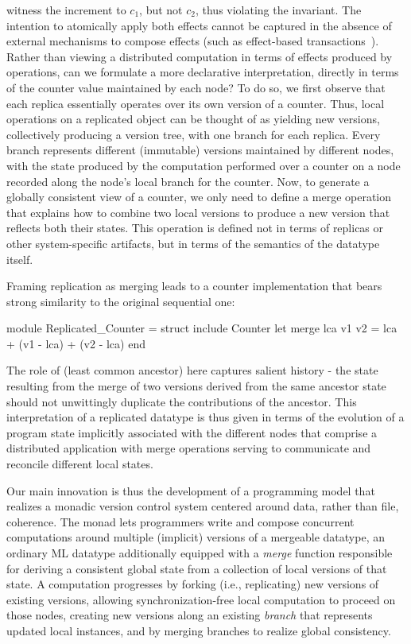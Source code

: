 witness the increment to $c_1$, but not $c_2$, thus violating the
invariant. The intention to atomically apply both effects cannot be
captured in the absence of external mechanisms to compose effects
(such as effect-based transactions~\cite{pldi15}).  Rather than
viewing a distributed computation in terms of  effects produced
by operations, can we formulate a more declarative interpretation,
directly in terms of the counter value maintained by each node?  To do
so, we first observe that each replica essentially operates over its
own version of a counter.  Thus, local operations on a replicated
object can be thought of as yielding new versions, collectively
producing a version tree, with one branch for each replica.  Every
branch represents different (immutable) versions maintained by
different nodes, with the state produced by the computation performed
over a counter on a node recorded along the node's local branch for
the counter.  Now, to generate a globally consistent view of a
counter, we only need to define a merge operation that explains how to
combine two local versions to produce a new version that reflects both
their states.  This operation is defined not in terms of replicas or
other system-specific artifacts, but in terms of the semantics of the
datatype itself.

Framing replication as merging leads to a counter implementation that
bears strong similarity to the original sequential one:
  \begin{ocaml}
    module Replicated_Counter = struct
      include Counter
      let merge lca v1 v2 =
         lca + (v1 - lca) + (v2 - lca)
    end
  \end{ocaml}
The role of  (least common ancestor) here captures salient
history - the state resulting from the merge of two versions derived
from the same ancestor state should not unwittingly duplicate the
contributions of the ancestor.  This interpretation of a replicated
datatype is thus given in terms of the evolution of a program state
implicitly associated with the different nodes that comprise a
distributed application with merge operations serving to communicate
and reconcile different local states.

Our main innovation is thus the development of a programming model
that realizes a monadic version control system centered around data,
rather than file, coherence.  The \name monad lets programmers write
and compose concurrent computations around multiple (implicit)
versions of a mergeable datatype, an ordinary ML datatype additionally
equipped with a \emph{merge} function responsible for deriving a
consistent global state from a collection of local versions of that
state.  A computation progresses by forking (i.e., replicating) new
versions of existing versions, allowing synchronization-free local
computation to proceed on those nodes, creating new versions along an
existing \emph{branch} that represents updated local instances, and by
merging branches to realize global consistency.

